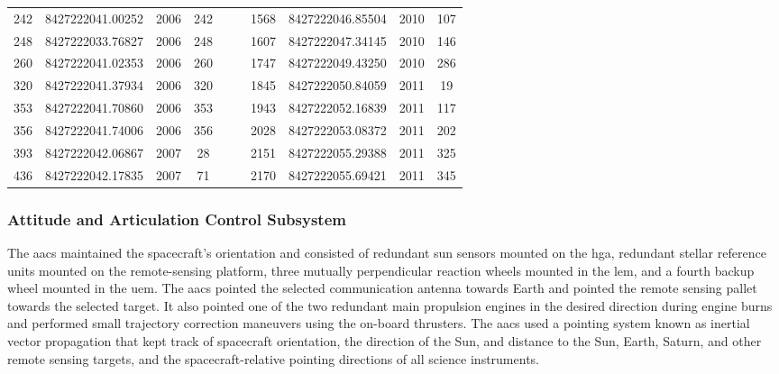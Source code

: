 \documentclass{article}
\begin{document}
\begin{table}[H]
\begin{tabular}{|ccccc|ccccc|}
                        242&8427222041.00252&2006&242
                            &&&1568&8427222046.85504&2010&107\\
                        248&8427222033.76827&2006&248
                            &&&1607&8427222047.34145&2010&146\\
                        260&8427222041.02353&2006&260
                            &&&1747&8427222049.43250&2010&286\\
                        320&8427222041.37934&2006&320
                            &&&1845&8427222050.84059&2011& 19\\
                        353&8427222041.70860&2006&353
                            &&&1943&8427222052.16839&2011&117\\
                        356&8427222041.74006&2006&356
                            &&&2028&8427222053.08372&2011&202\\
                        393&8427222042.06867&2007&28
                            &&&2151&8427222055.29388&2011&325\\
                        436&8427222042.17835&2007&71
                            &&&2170&8427222055.69421&2011&345\\
                        \hline
                    \end{tabular}
                \end{table}
            \subsubsection{%
                \footnotesize{%
                    Attitude and Articulation
                    Control Subsystem
                }
            }
                \label{subsubsec:usr_att_and_art_cont_subsye}
                The \gls{aacs} maintained the spacecraft's
                orientation and consisted of redundant sun
                sensors mounted on the \gls{hga}, redundant
                stellar reference units mounted on the
                remote-sensing platform, three mutually
                perpendicular reaction wheels mounted in the
                \gls{lem}, and a fourth backup wheel mounted in
                the \gls{uem}. The \gls{aacs} pointed the selected
                communication antenna towards Earth and pointed
                the remote sensing pallet towards the selected
                target. It also pointed one of the two redundant
                main propulsion engines in the desired direction
                during engine burns and performed small trajectory
                correction maneuvers using the on-board thrusters.
                The \gls{aacs} used a pointing system known as
                \gls{inertial vector propagation} that kept track
                of spacecraft orientation, the direction of the
                Sun, and distance to the Sun, Earth, Saturn,
                and other remote sensing targets, and the
                spacecraft-relative pointing directions of all
                science instruments.
\end{document}
